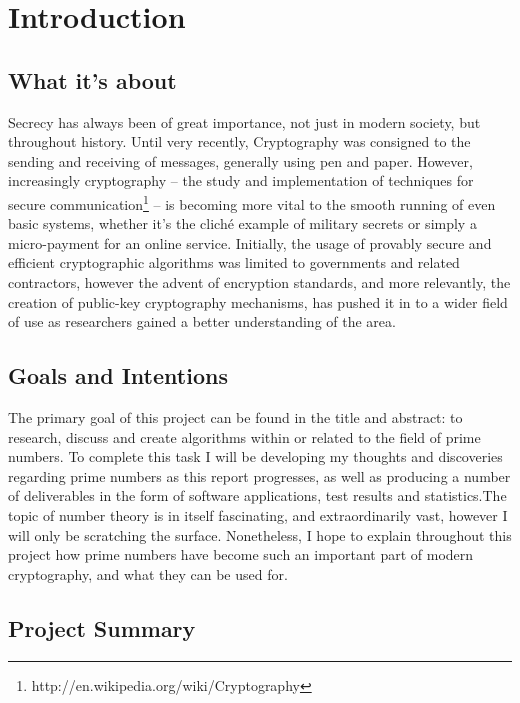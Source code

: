 \chapter{Introduction}
\label{Chapter1}

\section{What it's about}

Secrecy has always been of great importance, not just in modern society, but throughout history. Until very recently, Cryptography was consigned to the sending and receiving of messages, generally using pen and paper. However, increasingly cryptography -- the study and implementation of techniques for secure communication\footnote{http://en.wikipedia.org/wiki/Cryptography} -- is becoming more vital to the smooth running of even basic systems, whether it's the clich\'{e} example of military secrets or simply a micro-payment for an online service. Initially, the usage of provably secure and efficient cryptographic algorithms was limited to governments and related contractors, however the advent of encryption standards, and more relevantly, the creation of public-key cryptography mechanisms, has pushed it in to a wider field of use as researchers gained a better understanding of the area. 

\section{Goals and Intentions}

The primary goal of this project can be found in the title and abstract: to research, discuss and create algorithms within or related to the field of prime numbers. To complete this task I will be developing my thoughts and discoveries regarding prime numbers as this report progresses, as well as producing a number of deliverables in the form of software applications, test results and statistics.The topic of number theory is in itself fascinating, and extraordinarily vast, however I will only be scratching the surface. Nonetheless, I hope to explain throughout this project how prime numbers have become such an important part of modern cryptography, and what they can be used for.

\section{Project Summary}

